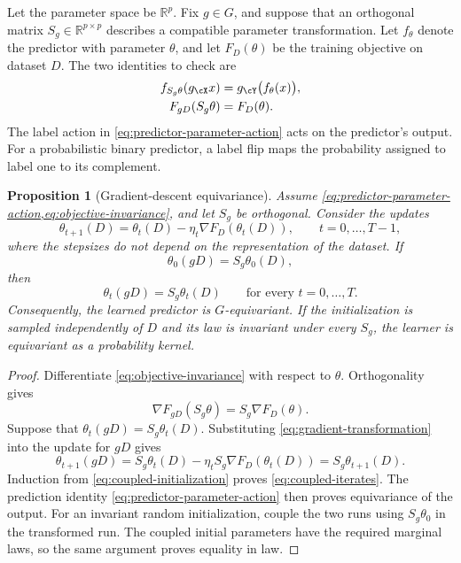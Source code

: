 \documentclass[11pt,twoside]{article}
\newcommand{\R}{\mathbb R}
\newtheorem{proposition}[theorem]{Proposition}
\theoremstyle{definition}
\theoremstyle{remark}
\begin{document}
Let the parameter space be \(\R^p\). Fix \(g\in G\), and suppose that an
orthogonal matrix \(S_g\in\R^{p\times p}\) describes a compatible parameter
transformation. Let \(f_\theta\) denote the predictor with parameter
\(\theta\), and let \(F_D(\theta)\) be the training objective on dataset
\(D\). The two identities to check are
\begin{align}
 f_{S_g\theta}(g_{\cX}x)&=g_{\cY}\bigl(f_\theta(x)\bigr),
 \label{eq:predictor-parameter-action}\\
 F_{gD}(S_g\theta)&=F_D(\theta).
 \label{eq:objective-invariance}
\end{align}
The label action in \cref{eq:predictor-parameter-action} acts on the
predictor's output. For a probabilistic binary predictor, a label flip maps
the probability assigned to label one to its complement.

\begin{proposition}[Gradient-descent equivariance]
\label{prop:gd-equivariance}
Assume \cref{eq:predictor-parameter-action,eq:objective-invariance}, and let
\(S_g\) be orthogonal. Consider the updates
\begin{equation}
 \theta_{t+1}(D)=\theta_t(D)-\eta_t\nabla F_D(\theta_t(D)),
 \qquad t=0,\ldots,T-1,
 \label{eq:gd-update}
\end{equation}
where the stepsizes do not depend on the representation of the dataset. If
\begin{equation}
 \theta_0(gD)=S_g\theta_0(D),
 \label{eq:coupled-initialization}
\end{equation}
then
\begin{equation}
 \theta_t(gD)=S_g\theta_t(D)
 \qquad\text{for every }t=0,\ldots,T.
 \label{eq:coupled-iterates}
\end{equation}
Consequently, the learned predictor is \(G\)-equivariant. If the
initialization is sampled independently of \(D\) and its law is invariant
under every \(S_g\), the learner is equivariant as a probability kernel.
\end{proposition}
\begin{proof}
Differentiate \cref{eq:objective-invariance} with respect to \(\theta\).
Orthogonality gives
\begin{equation}
 \nabla F_{gD}(S_g\theta)=S_g\nabla F_D(\theta).
 \label{eq:gradient-transformation}
\end{equation}
Suppose that \(\theta_t(gD)=S_g\theta_t(D)\). Substituting
\cref{eq:gradient-transformation} into the update for \(gD\) gives
\[
 \theta_{t+1}(gD)
 =S_g\theta_t(D)-\eta_t S_g\nabla F_D(\theta_t(D))
 =S_g\theta_{t+1}(D).
\]
Induction from \cref{eq:coupled-initialization} proves
\cref{eq:coupled-iterates}. The prediction identity
\cref{eq:predictor-parameter-action} then proves equivariance of the output.
For an invariant random initialization, couple the two runs using
\(S_g\theta_0\) in the transformed run. The coupled initial parameters have
the required marginal laws, so the same argument proves equality in law.
\end{proof}
\end{document}
